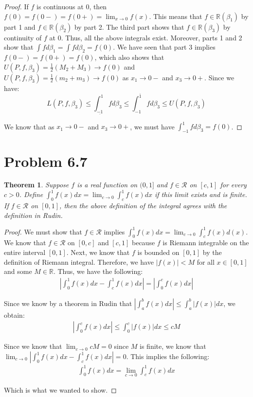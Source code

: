 \documentclass[psamsfonts]{amsart}
\newtheorem{thm}{Theorem}[section]
\theoremstyle{definition}
\theoremstyle{remark}
\numberwithin{equation}{section}
\begin{document}
\begin{proof}
If $f$ is continuous at $0$, then $f(0) = f(0-) = f(0+) = \lim_{x \to 0} f(x)$. This means that $f \in \mathbb{R}(\beta_1)$ by part 1 and $f \in \mathbb{R}(\beta_2)$ by part 2. The third part shows that $f \in \mathbb{R}(\beta_3)$ by continuity of $f$ at $0$. Thus, all the above integrals exist. Moreover, parts 1 and 2 show that $\int f d \beta_1 = \int f d \beta_2 = f(0)$. We have seen that part 3 implies $f(0-) = f(0+) = f(0)$, which also shows that $U(P,f,\beta_3) = \frac{1}{2}(M_2 + M_3) \to f(0)$ and $U(P,f,\beta_3) = \frac{1}{2}(m_2 + m_3) \to f(0)$ as $x_1 \to 0-$ and $x_3 \to 0+$. Since we have:
\begin{equation}
L(P,f,\beta_3) \leq \int_{\underline{-1}}^{1} f d \beta_3 \leq \int_{{-1}}^{\overline{1}} f d \beta_3 \leq U(P,f,\beta_3)
\end{equation}

We know that as $x_1 \to 0-$ and $x_3 \to 0+$, we must have $\int_{-1}^1 f d \beta_3 = f(0)$. 
\end{proof}


\section{Problem 6.7}

\begin{thm}
Suppose $f$ is a real function on $(0,1]$ and $f \in \mathscr{R}$ on $[c,1]$ for every $c > 0$. Define $\int_0^1 f(x) dx = \lim_{c \to 0} \int_c^1 f(x) dx$ if this limit exists and is finite. If $f \in \mathscr{R}$ on $[0,1]$, then the above definition of the integral agrees with the definition in Rudin.
\end{thm}

\begin{proof}
We must show that $f \in \mathscr{R}$ implies $\int_0^1 f(x) dx = \lim_{c \to 0} \int_c^1 f(x) d(x)$. We know that $f \in \mathscr{R}$ on $[0,c]$ and $[c,1]$ because $f$ is Riemann integrable on the entire interval $[0,1]$. Next, we know that $f$ is bounded on $[0,1]$ by the definition of Riemann integral. Therefore, we have $|f(x)| < M$ for all $x \in[0,1]$ and some $M \in \mathbb{R}$. Thus, we have the following:
\begin{eqnarray}
\left| \int_0^1 f(x) dx - \int_c^1 f(x) dx \right|  = \left| \int_0^c f(x) dx \right| 
\end{eqnarray}

Since we know by a theorem in Rudin that $|\int_a^b f(x) dx| \leq \int_a^b |f(x)| dx$, we obtain:
\begin{eqnarray}
\left| \int_0^c f(x) dx \right| \leq \int_0^c |f(x)| dx \leq c M
\end{eqnarray}

Since we know that $\lim_{c \to 0} c M = 0$ since $M$ is finite, we know that $\lim_{c \to 0} | \int_0^1 f(x) dx - \int_c^1 f(x) dx| = 0$. This implies the following:
\begin{eqnarray}
\int_0^1 f(x) dx = \lim_{c \to 0} \int_c^1 f(x) dx 
\end{eqnarray}

Which is what we wanted to show.
\end{proof}
\end{document}
